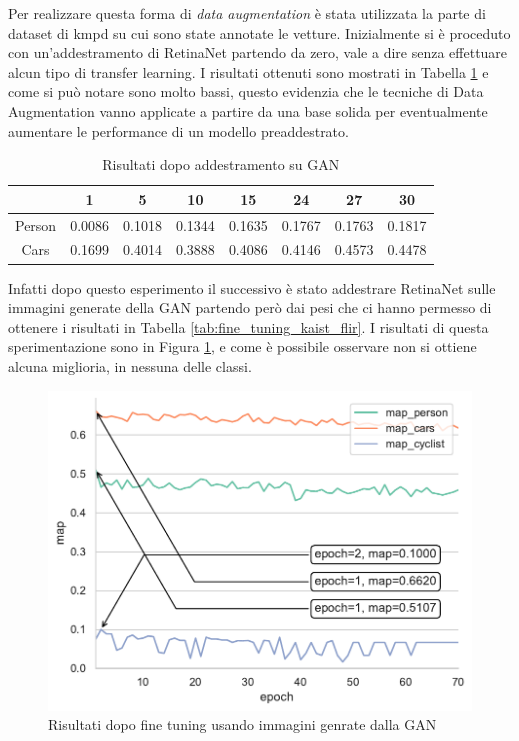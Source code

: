 Per realizzare questa forma di \textit{data augmentation} è stata utilizzata la parte di dataset di \ac{kmpd} su cui sono state annotate le vetture. Inizialmente si è proceduto con un'addestramento di RetinaNet partendo da zero, vale a dire senza effettuare alcun tipo di transfer learning. 
I risultati ottenuti sono mostrati in Tabella \ref{tab:result_GAN_scratch} e come si può notare sono molto bassi, questo evidenzia che le tecniche di Data Augmentation vanno applicate a partire da una base solida per eventualmente aumentare le performance di un modello preaddestrato. 
\begin{table}[]
    \begin{tabular}{c|c|c|c|c|c|c|c|}
    \cline{2-8}
     & 1 & 5 & 10 & 15 & \textbf{24} & \textbf{27} & 30 \\ \hline
    \multicolumn{1}{|c|}{Person} & 0.0086 & 0.1018 & 0.1344 & 0.1635 & 0.1767 & 0.1763 & 0.1817 \\ \hline
    \multicolumn{1}{|c|}{Cars} & 0.1699 & 0.4014 & 0.3888 & 0.4086 & 0.4146 & 0.4573 & 0.4478 \\ \hline
    \end{tabular}
    \caption{Risultati dopo addestramento su GAN}
    \label{tab:result_GAN_scratch}
\end{table}
Infatti dopo questo esperimento il successivo è stato addestrare RetinaNet sulle immagini generate della \ac{GAN} partendo però dai pesi che ci hanno permesso di ottenere i risultati in Tabella \ref{tab:fine_tuning_kaist_flir}. I risultati di questa sperimentazione sono in Figura \ref{fig:fine_tuning_gan}, e come è possibile osservare non si ottiene alcuna miglioria, in nessuna delle classi. 
\begin{figure}[]
    \centering
    \includegraphics[width=\textwidth]{images/graphic/graphics_GAN.pdf}
    \caption{Risultati dopo fine tuning usando immagini genrate dalla GAN}
    \label{fig:fine_tuning_gan}
\end{figure}

